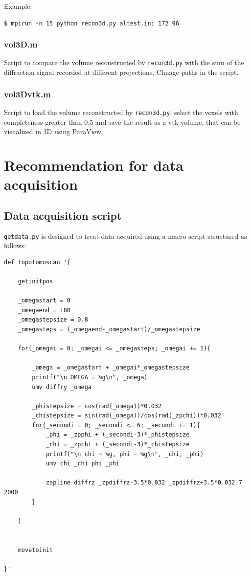 \documentclass[11pt]{scrartcl}
\begin{document}
Example:

{\texttt{\$ mpirun -n 15 python recon3d.py al\textunderscore test.ini 172 96}} 
\subsubsection{vol3D.m}

Script to compare the volume reconstructed by {\texttt{recon3d.py}} with the sum of the diffraction signal recorded at different projections. Chnage paths in the script. 

\subsubsection{vol3D\textunderscore vtk.m}

Script to load the volume reconstructed by {\texttt{recon3d.py}}, select the voxels with completeness greater than 0.5 and save the result as a vtk volume, that can be visualized in {\footnotesize{3D}} using ParaView.

\section{Recommendation for data acquisition}\label{sec:data_acquisition}

\subsection{Data acquisition script}

{\texttt{getdata.py}} is designed to treat data acquired using a macro script structured as follows:

\begin{lstlisting}
def topotomoscan '{

    getinitpos
    
    _omegastart = 0
    _omegaend = 180
    _omegastepsize = 0.8
    _omegasteps = (_omegaend-_omegastart)/_omegastepsize

    for(_omegai = 0; _omegai <= _omegasteps; _omegai += 1){
        
        _omega = _omegastart + _omegai*_omegastepsize
        printf("\n OMEGA = %g\n", _omega)
        umv diffry _omega
        
        _phistepsize = cos(rad(_omega))*0.032
        _chistepsize = sin(rad(_omega))/cos(rad(_zpchi))*0.032
        for(_secondi = 0; _secondi <= 6; _secondi += 1){
            _phi = _zpphi + (_secondi-3)*_phistepsize
            _chi = _zpchi + (_secondi-3)*_chistepsize
            printf("\n chi = %g, phi = %g\n", _chi, _phi)
            umv chi _chi phi _phi
            
            zapline diffrz _zpdiffrz-3.5*0.032 _zpdiffrz+3.5*0.032 7 2000    
        }

    }
    
        
    movetoinit

}'
\end{lstlisting}
\end{document}

